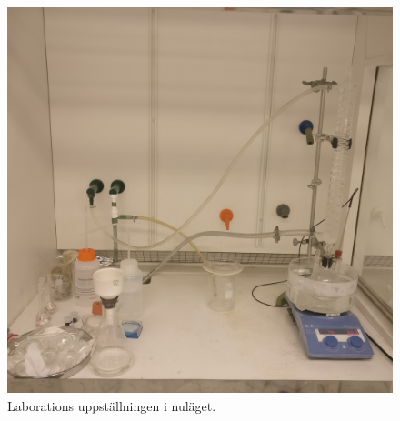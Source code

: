 \newpage
\thispagestyle{empty}
\begin{figure}[H]
    \centering
    \includegraphics[scale=0.1]{labsetup.jpg}
    \caption{Laborations uppställningen i nuläget.}
    \label{fig:labbild}
\end{figure}



